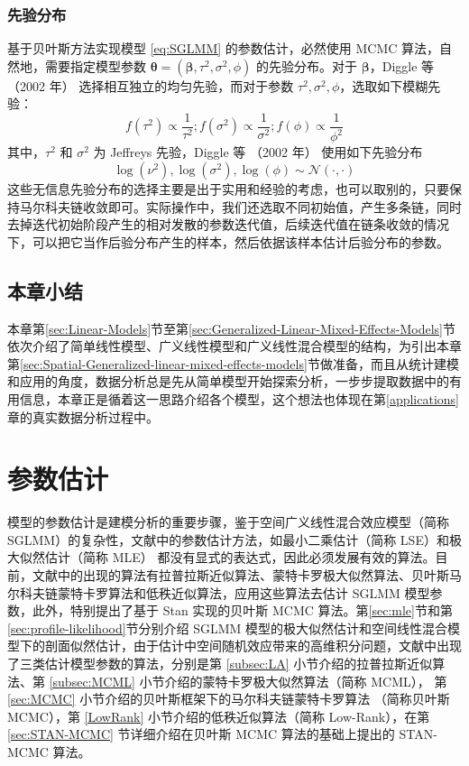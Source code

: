 \documentclass[12pt,a4paper,UTF8,twoside]{book}
\theoremstyle{definition}
\theoremstyle{definition}
\theoremstyle{definition}
\theoremstyle{remark}
\begin{document}
\hypertarget{subsec:prior-sglmm}{%
\subsection{先验分布}\label{subsec:prior-sglmm}}

基于贝叶斯方法实现模型 \eqref{eq:SGLMM} 的参数估计，必然使用 MCMC
算法，自然地，需要指定模型参数
\(\boldsymbol{\theta} = (\boldsymbol{\beta},\tau^2,\sigma^2,\phi)\)
的先验分布。对于 \(\boldsymbol{\beta}\)，Diggle 等 （2002 年）
\citep{Diggle2002Childhood} 选择相互独立的均匀先验，而对于参数
\(\tau^2,\sigma^2,\phi\)，选取如下模糊先验：
\[f(\tau^2) \propto \frac{1}{\tau^2};f(\sigma^2) \propto \frac{1}{\sigma^2};f(\phi) \propto \frac{1}{\phi^2}\]
\noindent 其中，\(\tau^2\) 和 \(\sigma^2\) 为 Jeffreys 先验，Diggle 等
（2002 年） \citep{Diggle2002Childhood} 使用如下先验分布
\begin{equation*}
\log(\nu^2),\log(\sigma^2),\log(\phi)  \sim \mathcal{N}(\cdot,\cdot)
\end{equation*}
这些无信息先验分布的选择主要是出于实用和经验的考虑，也可以取别的，只要保持马尔科夫链收敛即可。实际操作中，我们还选取不同初始值，产生多条链，同时去掉迭代初始阶段产生的相对发散的参数迭代值，后续迭代值在链条收敛的情况下，可以把它当作后验分布产生的样本，然后依据该样本估计后验分布的参数。

\hypertarget{sec:models}{%
\section{本章小结}\label{sec:models}}

本章第\ref{sec:Linear-Models}节至第\ref{sec:Generalized-Linear-Mixed-Effects-Models}节依次介绍了简单线性模型、广义线性模型和广义线性混合模型的结构，为引出本章第\ref{sec:Spatial-Generalized-linear-mixed-effects-models}节做准备，而且从统计建模和应用的角度，数据分析总是先从简单模型开始探索分析，一步步提取数据中的有用信息，本章正是循着这一思路介绍各个模型，这个想法也体现在第\ref{applications}章的真实数据分析过程中。

\hypertarget{algorithms}{%
\chapter{参数估计}\label{algorithms}}

模型的参数估计是建模分析的重要步骤，鉴于空间广义线性混合效应模型（简称
SGLMM）的复杂性，文献中的参数估计方法，如最小二乘估计（简称
LSE）和极大似然估计（简称 MLE）
都没有显式的表达式，因此必须发展有效的算法。目前，文献中的出现的算法有拉普拉斯近似算法、蒙特卡罗极大似然算法、贝叶斯马尔科夫链蒙特卡罗算法和低秩近似算法，应用这些算法去估计
SGLMM 模型参数，此外，特别提出了基于 Stan 实现的贝叶斯 MCMC
算法。第\ref{sec:mle}节和第\ref{sec:profile-likelihood}节分别介绍 SGLMM
模型的极大似然估计和空间线性混合模型下的剖面似然估计，由于估计中空间随机效应带来的高维积分问题，文献中出现了三类估计模型参数的算法，分别是第
\ref{subsec:LA} 小节介绍的拉普拉斯近似算法、第 \ref{subsec:MCML}
小节介绍的蒙特卡罗极大似然算法（简称 MCML）， 第 \ref{sec:MCMC}
小节介绍的贝叶斯框架下的马尔科夫链蒙特卡罗算法 （简称贝叶斯 MCMC），第
\ref{LowRank} 小节介绍的低秩近似算法（简称 Low-Rank），在第
\ref{sec:STAN-MCMC} 节详细介绍在贝叶斯 MCMC 算法的基础上提出的 STAN-MCMC
算法。
\end{document}
